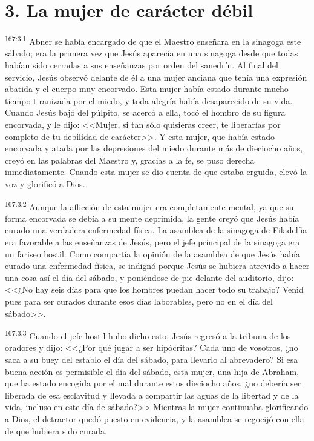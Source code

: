 \section*{3. La mujer de carácter débil}
\par 
\textsuperscript{167:3.1} Abner se había encargado de que el Maestro enseñara en la sinagoga este sábado; era la primera vez que Jesús aparecía en una sinagoga desde que todas habían sido cerradas a sus enseñanzas por orden del sanedrín. Al final del servicio, Jesús observó delante de él a una mujer anciana que tenía una expresión abatida y el cuerpo muy encorvado. Esta mujer había estado durante mucho tiempo tiranizada por el miedo, y toda alegría había desaparecido de su vida. Cuando Jesús bajó del púlpito, se acercó a ella, tocó el hombro de su figura encorvada, y le dijo: <<Mujer, si tan sólo quisieras creer, te liberarías por completo de tu debilidad de carácter>>. Y esta mujer, que había estado encorvada y atada por las depresiones del miedo durante más de dieciocho años, creyó en las palabras del Maestro y, gracias a la fe, se puso derecha inmediatamente. Cuando esta mujer se dio cuenta de que estaba erguida, elevó la voz y glorificó a Dios.

\par 
\textsuperscript{167:3.2} Aunque la aflicción de esta mujer era completamente mental, ya que su forma encorvada se debía a su mente deprimida, la gente creyó que Jesús había curado una verdadera enfermedad física. La asamblea de la sinagoga de Filadelfia era favorable a las enseñanzas de Jesús, pero el jefe principal de la sinagoga era un fariseo hostil. Como compartía la opinión de la asamblea de que Jesús había curado una enfermedad física, se indignó porque Jesús se hubiera atrevido a hacer una cosa así el día del sábado, y poniéndose de pie delante del auditorio, dijo: <<¿No hay seis días para que los hombres puedan hacer todo su trabajo? Venid pues para ser curados durante esos días laborables, pero no en el día del sábado>>.

\par 
\textsuperscript{167:3.3} Cuando el jefe hostil hubo dicho esto, Jesús regresó a la tribuna de los oradores y dijo: <<¿Por qué jugar a ser hipócritas? Cada uno de vosotros, ¿no saca a su buey del establo el día del sábado, para llevarlo al abrevadero? Si esa buena acción es permisible el día del sábado, esta mujer, una hija de Abraham, que ha estado encogida por el mal durante estos dieciocho años, ¿no debería ser liberada de esa esclavitud y llevada a compartir las aguas de la libertad y de la vida, incluso en este día de sábado?>> Mientras la mujer continuaba glorificando a Dios, el detractor quedó puesto en evidencia, y la asamblea se regocijó con ella de que hubiera sido curada.

